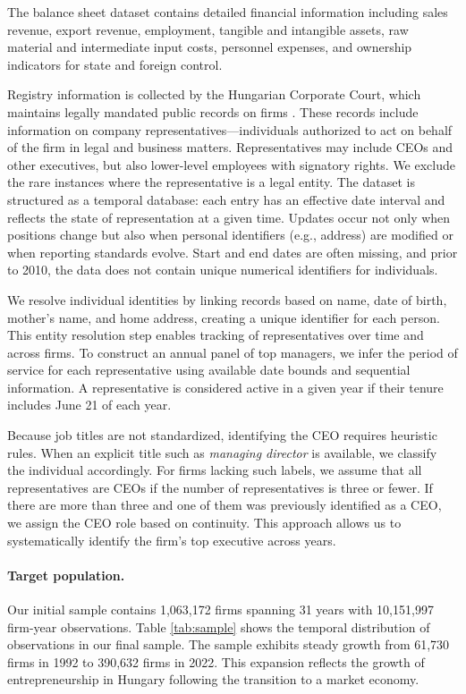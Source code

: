 \documentclass[11pt,a4paper]{article}
\begin{document}
The balance sheet dataset contains detailed financial information including sales revenue, export revenue, employment, tangible and intangible assets, raw material and intermediate input costs, personnel expenses, and ownership indicators for state and foreign control.

Registry information is collected by the Hungarian Corporate Court, which maintains legally mandated public records on firms \citep{cegtv}. These records include information on company representatives---individuals authorized to act on behalf of the firm in legal and business matters. Representatives may include CEOs and other executives, but also lower-level employees with signatory rights. We exclude the rare instances where the representative is a legal entity. The dataset is structured as a temporal database: each entry has an effective date interval and reflects the state of representation at a given time. Updates occur not only when positions change but also when personal identifiers (e.g., address) are modified or when reporting standards evolve. Start and end dates are often missing, and prior to 2010, the data does not contain unique numerical identifiers for individuals.

We resolve individual identities by linking records based on name, date of birth, mother's name, and home address, creating a unique identifier for each person. This entity resolution step enables tracking of representatives over time and across firms. To construct an annual panel of top managers, we infer the period of service for each representative using available date bounds and sequential information. A representative is considered active in a given year if their tenure includes June 21 of each year.

Because job titles are not standardized, identifying the CEO requires heuristic rules. When an explicit title such as \emph{managing director} is available, we classify the individual accordingly. For firms lacking such labels, we assume that all representatives are CEOs if the number of representatives is three or fewer. If there are more than three and one of them was previously identified as a CEO, we assign the CEO role based on continuity. This approach allows us to systematically identify the firm's top executive across years.

\paragraph{Target population.} Our initial sample contains 1,063,172 firms spanning 31 years with 10,151,997 firm-year observations. Table \ref{tab:sample} shows the temporal distribution of observations in our final sample. The sample exhibits steady growth from 61,730 firms in 1992 to 390,632 firms in 2022. This expansion reflects the growth of entrepreneurship in Hungary following the transition to a market economy.
\end{document}
